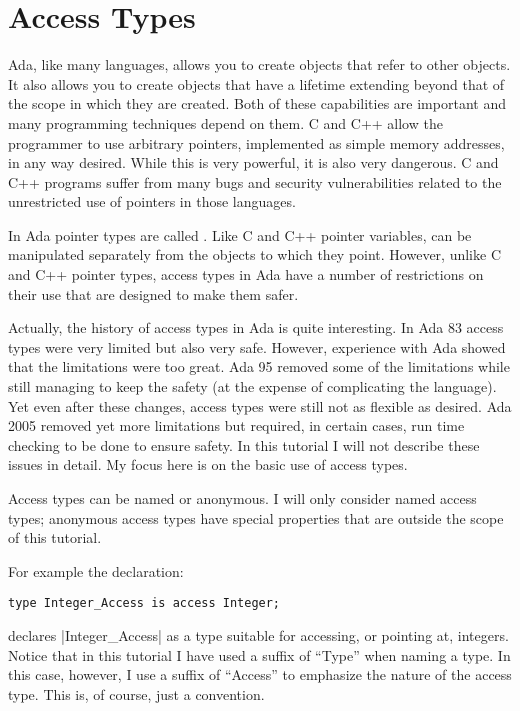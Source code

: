 \section{Access Types}

Ada, like many languages, allows you to create objects that refer to other objects. It also
allows you to create objects that have a lifetime extending beyond that of the scope in which
they are created. Both of these capabilities are important and many programming techniques
depend on them. C and C++ allow the programmer to use arbitrary pointers, implemented as simple
memory addresses, in any way desired. While this is very powerful, it is also very dangerous. C
and C++ programs suffer from many bugs and security vulnerabilities related to the unrestricted
use of pointers in those languages.

In Ada pointer types are called . Like C and C++ pointer variables,
 can be manipulated separately from the objects to which they point.
However, unlike C and C++ pointer types, access types in Ada have a number of restrictions on
their use that are designed to make them safer.

Actually, the history of access types in Ada is quite interesting. In Ada 83 access types were
very limited but also very safe. However, experience with Ada showed that the limitations were
too great. Ada 95 removed some of the limitations while still managing to keep the safety (at
the expense of complicating the language). Yet even after these changes, access types were still
not as flexible as desired. Ada 2005 removed yet more limitations but required, in certain
cases, run time checking to be done to ensure safety. In this tutorial I will not describe these
issues in detail. My focus here is on the basic use of access types.

Access types can be named or anonymous. I will only consider named access types; anonymous
access types have special properties that are outside the scope of this tutorial.

For example the declaration:

\begin{lstlisting}
type Integer_Access is access Integer;
\end{lstlisting}

\noindent declares |Integer_Access| as a type suitable for accessing, or pointing at, integers.
Notice that in this tutorial I have used a suffix of ``Type'' when naming a type. In this case,
however, I use a suffix of ``Access'' to emphasize the nature of the access type. This is, of
course, just a convention.

